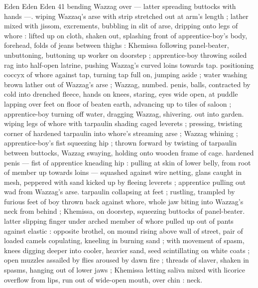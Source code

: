 Eden Eden Eden 41
bending Wazzag over — latter spreading buttocks with hands —.
wiping Wazzaq's arse with strip stretched out at arm's length ; lather
mixed with jissom, excrements, bubbling in slit of arse, dripping onto
legs of whore : lifted up on cloth, shaken out, splashing front of
apprentice-boy's body, forehead, folds of jeans between thighs :
Khemissa following panel-beater, unbuttoning, buttoning up worker
on doorstep ; apprentice-boy throwing soiled rag into half-open
latrine, pushing Wazzag's curved loins towards tap. positioning
coccyx of whore against tap, turning tap full on, jumping aside ;
water washing brown lather out of Wazzag's arse ; Wazzag, numbed.
penis, balls, contracted by cold into drenched fleece, hands on
knees, staring, eyes wide open, at puddle lapping over feet on floor
of beaten earth, advancing up to tiles of saloon ; apprentice-boy
turning off water, dragging Wazzag, shivering. out into garden.
wiping legs of whore with tarpaulin shading caged leverets ;
pressing, twisting corner of hardened tarpaulin into whore's
streaming arse ; Wazzag whining ; apprentice-boy’s fist squeezing
hip ; thrown forward by twisting of tarpaulin between buttocks,
Wazzag swaying, holding onto wooden frame of cage. hardened
penis — fist of apprentice kneading hip : pulling at skin of lower
belly, from root of member up towards loins — squashed against
wire netting, glans caught in mesh, peppered with sand kicked up by
fleeing leverets ; apprentice pulling out wad from Wazzag's arse.
tarpaulin collapsing at feet ; rustling, trampled by furious feet of boy
thrown back against whore, whole jaw biting into Wazzag's neck from
behind ; Khemissa, on doorstep, squeezing buttocks of panel-beater.
latter slipping finger under arched member of whore pulled up out of
pants against elastic : opposite brothel, on mound rising above wall
of street, pair of loaded camels copulating, kneeling in burning sand
; with movement of spasm, knees digging deeper into cooler, heavier
sand, seed scintillating on white coats ; open muzzles assailed by
flies aroused by dawn fire ; threads of slaver, shaken in spasms,
hanging out of lower jaws ; Khemissa letting saliva mixed with licorice
overflow from lips, run out of wide-open mouth, over chin : neck.


